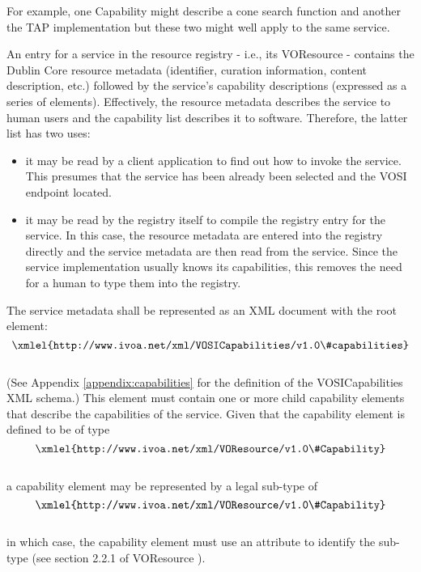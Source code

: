 \documentclass[11pt,letter]{ivoa}
\begin{document}
For example, one Capability might describe a cone search function and
another the TAP implementation but these two might well apply to the
same service.

An entry for a service in the resource registry - i.e., its VOResource -
contains the Dublin Core resource metadata (identifier, curation
information, content description, etc.) followed by the service's
capability descriptions (expressed as a series of
elements). Effectively, the resource metadata describes the service to
human users and the capability list describes it to software. Therefore,
the latter list has two uses:

\begin{itemize}
\item it may be read by a client application to find out how to invoke
the service. This presumes that the service has been already been
selected and the VOSI endpoint located.
\item it may be read by the registry itself to compile the registry
entry for the service. In this case, the resource metadata are entered
into the registry directly and the service metadata are then read from
the service. Since the service implementation usually knows its
capabilities, this removes the need for a human to type them into the
registry. 
\end{itemize}

The service metadata shall be represented as an XML document with the root element:\\
$$\hbox{\xmlel{http://www.ivoa.net/xml/VOSICapabilities/v1.0\#capabilities}}$$\\
(See Appendix \ref{appendix:capabilities} for the definition of the
VOSICapabilities XML schema.) This element must contain one or more
child capability elements that describe the capabilities of the service.
Given that the capability element is defined to be of type\\
$$\hbox{\xmlel{http://www.ivoa.net/xml/VOResource/v1.0\#Capability}}$$\\
a capability element may be represented by a legal sub-type of\\
$$\hbox{\xmlel{http://www.ivoa.net/xml/VOResource/v1.0\#Capability}}$$\\
in which case, the capability element must use an 
attribute to identify the sub-type (see section 2.2.1 of VOResource
\citep{2018ivoa.spec.0625P}). 
\end{document}
